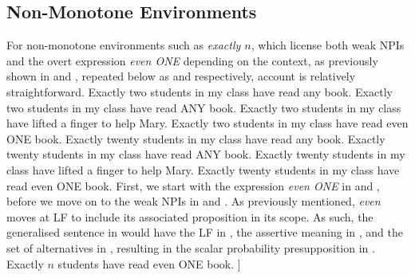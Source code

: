 \subsection{Non-Monotone Environments}
For non-monotone environments such as \textit{exactly $n$}, which license both weak NPIs and the overt expression \textit{even \MakeUppercase{one}} depending on the context, as previously shown in  and , repeated below as  and  respectively,  account is relatively straightforward.
\pex[nopreamble=true]\label{ex:even-nm-okay-repeat}%
\a{} Exactly two students in my class have read any book.
\a{} Exactly two students in my class have read \MakeUppercase{any} book.
\a{} Exactly two students in my class have lifted a finger to help Mary.
\a{} Exactly two students in my class have read even \MakeUppercase{one} book.
\xe
\pex[nopreamble=true]\label{ex:even-nm-bad-repeat}%
\a{}\ljudge{\#} Exactly twenty students in my class have read any book.
\a{}\ljudge{\#} Exactly twenty students in my class have read \MakeUppercase{any} book.
\a{}\ljudge{\#} Exactly twenty students in my class have lifted a finger to help Mary.
\a{}\ljudge{\#} Exactly twenty students in my class have read even \MakeUppercase{one} book.
\xe
First, we start with the expression \textit{even ONE} in  and , before we move on to the weak NPIs in  and . As previously mentioned, \textit{even} moves at LF to include its associated proposition in its scope. As such, the generalised sentence in  would have the LF in , the assertive meaning in , and the set of alternatives in , resulting in the scalar probability presupposition in .
\pex[nopreamble=true]%
\a{} Exactly $n$ students have read even \MakeUppercase{one} book.
\a[]\phantomsection [even\textsubscript{C} [exactly $n$ students read one\textsubscript{F} book]]
